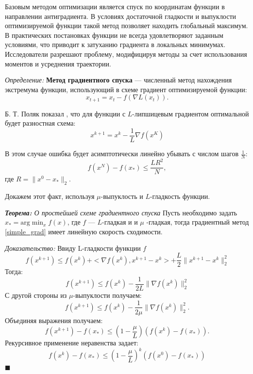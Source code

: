 Базовым методом оптимизации является спуск по координатам функции в направлении антиградиента. 
В условиях достаточной гладкости и выпуклости оптимизируемой функции такой метод позволяет находить глобальный максимум. 
В практических постановках функции не всегда удовлетворяют заданным условиями, что приводит к затуханию градиента 
в локальных минимумах. Исследователи разрешают проблему, модифицируя методы за счет использования моментов
и усреднения траектории.

\textit{Определение:} \textbf{Метод градиентного спуска} --- численный метод нахождения экстремума функции, использующий
в схеме градиент оптимизируемой функции:
\begin{equation}
    x_{t+1} = x_t - f(\nabla L(x_t)).
\end{equation}

Б. Т. Поляк показал \cite{polyak1990new}, что для функции с $L$-липшицевым градиентом оптимальной будет разностная схема: 
\begin{equation}
    x^{k+1} = x^k - \frac{1}{L} \nabla f(x^K)
    \label{simple_grad}
\end{equation}

В этом случае ошибка будет асимптотически линейно убывать с числом шагов $\frac{1}{N}$:
\begin{equation}
    f(x^N) -f(x_*) \le \frac{L R^2}{N},
\end{equation}
где $R=\| x^0 - x_* \|_2$. 

Докажем этот факт, используя $\mu$-выпуклость и $L$-гладкость функции.

\textit{\textbf{Теорема:} О простейшей схеме градиентного спуска} Пусть необходимо задать $x_*=\text{arg} \min_x f(x)$, где $f$ --- $L$-гладкая и
и $\mu$ -гладкая, тогда градиентный метод \ref{simple_grad} имеет линейную скорость сходимости.

\textit{Доказательство:} Ввиду L-гладкости функции $f$
\begin{equation}
    f(x^{k+1}) \le f(x^k) + <\nabla f(x^k), x^{k+1} -x^k> +\frac{L}{2} \|x^{k+1}-x^k\|_2^2
\end{equation}
Тогда:
\begin{equation}
    f(x^{k+1}) \le f(x^k) - \frac{1}{2L} \| \nabla f(x^k) \|^2_2
\end{equation}
С другой стороны из $\mu$-выпуклости получаем:
\begin{equation}
    f(x^{k+1}) \le f(x^k) - \frac{1}{2\mu} \| \nabla f(x^k) \|^2_2.
\end{equation}
Объединяя выражения получаем:
\begin{equation}
    f(x^{k+1}) -f(x_*) \le \left(1-\frac{\mu}{L}\right) (f(x^k)-f(x_*)).
\end{equation}
Рекурсивное применение неравенства задает:
\begin{equation}
    f(x^k) - f(x_*) \le (1-\frac{\mu}{L})^k (f(x^0)-f(x_*))
\end{equation}
$\blacksquare$

